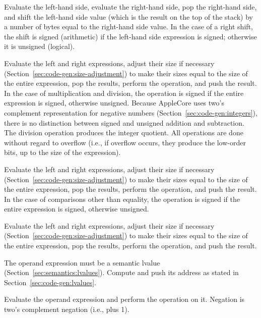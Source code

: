 \documentclass[10pt]{article}
\begin{document}
  Evaluate the left-hand side, evaluate the
right-hand side, pop the right-hand side, and shift the left-hand side
value (which is the result on the top of the stack) by a number of
bytes equal to the right-hand side value.  In the case of a right
shift, the shift is signed (arithmetic) if the left-hand side
expression is signed; otherwise it is unsigned (logical).

 Evaluate the left and right expressions, adjust their
size if necessary (Section~\ref{sec:code-gen:size-adjustment}) to make
their sizes equal to the size of the entire expression, pop the
results, perform the operation, and push the result.  In the case of
multiplication and division, the operation is signed if the entire
expression is signed, otherwise unsigned.  Because AppleCore uses
two's complement representation for negative numbers
(Section~\ref{sec:code-gen:integers}), there is no distinction between
signed and unsigned addition and subtraction.  The division operation
produces the integer quotient.  All operations are done without regard
to overflow (i.e., if overflow occurs, they produce the low-order
bits, up to the size of the expression).

 Evaluate the left and right expressions, adjust
their size if necessary (Section~\ref{sec:code-gen:size-adjustment})
to make their sizes equal to the size of the entire expression, pop
the results, perform the operation, and push the result.  In the case
of comparisons other than equality, the operation is signed if the
entire expression is signed, otherwise unsigned.

Evaluate the left and right expressions, adjust their size if
necessary (Section~\ref{sec:code-gen:size-adjustment}) to make their
sizes equal to the size of the entire expression, pop the results,
perform the operation, and push the result.

 
The operand expression must be a semantic lvalue
(Section~\ref{sec:semantics:lvalues}).  Compute and push its address
as stated in Section~\ref{sec:code-gen:lvalues}.

Evaluate the operand expression and perform the operation on it.
Negation is two's complement negation (i.e.,  plus 1).
\end{document}
